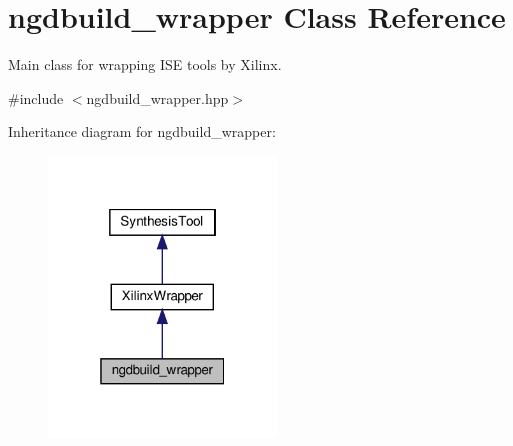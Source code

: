 \hypertarget{classngdbuild__wrapper}{}\section{ngdbuild\+\_\+wrapper Class Reference}
\label{classngdbuild__wrapper}


Main class for wrapping I\+SE tools by Xilinx.  




{\ttfamily \#include $<$ngdbuild\+\_\+wrapper.\+hpp$>$}



Inheritance diagram for ngdbuild\+\_\+wrapper\+:
\nopagebreak
\begin{figure}[H]
\begin{center}
\leavevmode
\includegraphics[width=172pt]{dd/d9c/classngdbuild__wrapper__inherit__graph}
\end{center}
\end{figure}


